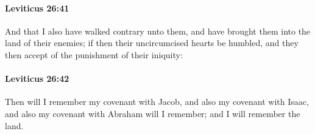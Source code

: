 		\paragraph{Leviticus 26:41} %
			\label{LEVITICUS-26-41}

			And that I also have walked contrary unto them, and have brought them into the land of their enemies; if then their uncircumcised hearts be humbled, and they then accept of the punishment of their iniquity:


		\paragraph{Leviticus 26:42} %
			\label{LEVITICUS-26-42}

			Then will I remember my covenant with Jacob, and also my covenant with Isaac, and also my covenant with Abraham will I remember; and I will remember the land.

